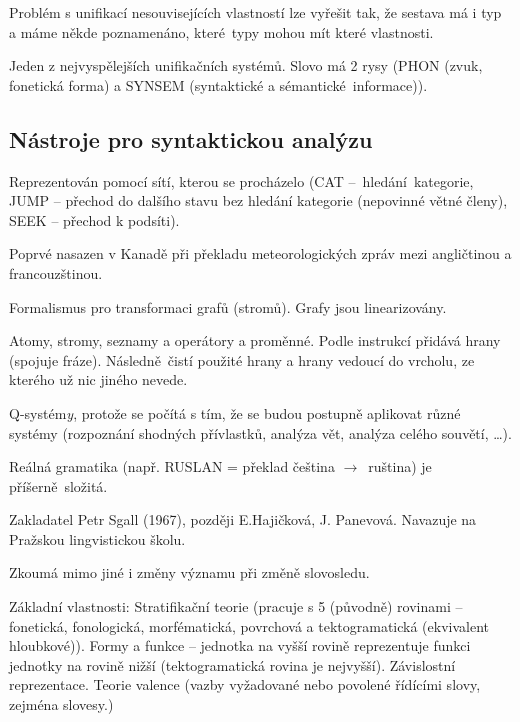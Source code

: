 \documentclass[12pt]{article}					%
\begin{document}
\begin{definice}
	Problém s unifikací nesouvisejících vlastností lze vyřešit tak, že sestava má i typ a máme někde poznamenáno, které typy mohou mít které vlastnosti.
\end{definice}

\begin{definice}[HPSG]
	Jeden z nejvyspělejších unifikačních systémů. Slovo má 2 rysy (PHON (zvuk, fonetická forma) a SYNSEM (syntaktické a sémantické informace)).
\end{definice}

	\subsection{Nástroje pro syntaktickou analýzu}
	\begin{definice}
		Reprezentován pomocí sítí, kterou se procházelo (CAT – hledání kategorie, JUMP – přechod do dalšího stavu bez hledání kategorie (nepovinné větné členy), SEEK – přechod k podsíti).
	\end{definice}

	\begin{definice}
		Poprvé nasazen v Kanadě při překladu meteorologických zpráv mezi angličtinou a francouzštinou.

		Formalismus pro transformaci grafů (stromů). Grafy jsou linearizovány.

		Atomy, stromy, seznamy a operátory a proměnné. Podle instrukcí přidává hrany (spojuje fráze). Následně čistí použité hrany a hrany vedoucí do vrcholu, ze kterého už nic jiného nevede.

		Q-systém\emph{y}, protože se počítá s tím, že se budou postupně aplikovat různé systémy (rozpoznání shodných přívlastků, analýza vět, analýza celého souvětí, …).

		Reálná gramatika (např. RUSLAN = překlad čeština $\rightarrow$ ruština) je příšerně složitá.
	\end{definice}


	\begin{definice}
		Zakladatel Petr Sgall (1967), později E.Hajičková, J. Panevová. Navazuje na Pražskou lingvistickou školu.

		Zkoumá mimo jiné i změny významu při změně slovosledu.

		Základní vlastnosti: Stratifikační teorie (pracuje s 5 (původně) rovinami – fonetická, fonologická, morfématická, povrchová a tektogramatická (ekvivalent hloubkové)). Formy a funkce – jednotka na vyšší rovině reprezentuje funkci jednotky na rovině nižší (tektogramatická rovina je nejvyšší). Závislostní reprezentace. Teorie valence (vazby vyžadované nebo povolené řídícími slovy, zejména slovesy.)
	\end{definice}
\end{document}
